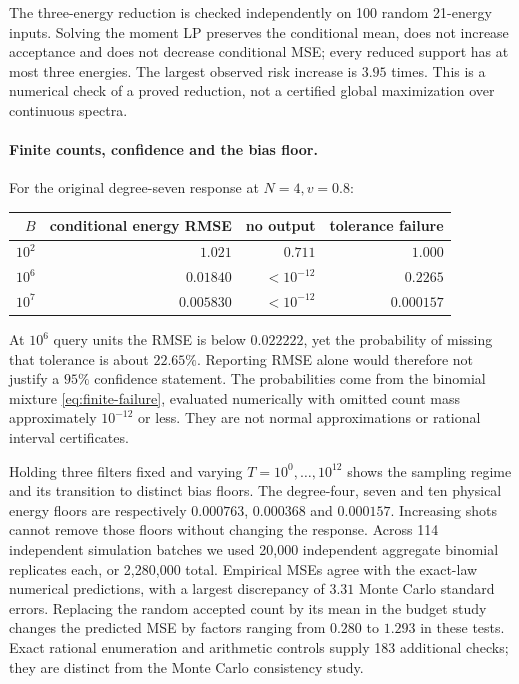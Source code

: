 The three-energy reduction is checked independently on 100 random
21-energy inputs. Solving the moment LP preserves the conditional mean,
does not increase acceptance and does not decrease conditional MSE;
every reduced support has at most three energies. The largest observed
risk increase is $3.95$ times. This is a numerical check of a proved
reduction, not a certified global maximization over continuous spectra.

\paragraph{Finite counts, confidence and the bias floor.}
For the original degree-seven response at $N=4,v=0.8$:
\begin{center}\small
\begin{tabular}{rrrr}
\toprule
$B$ & conditional energy RMSE & no output & tolerance failure\\
\midrule
$10^2$ & $1.021$ & $0.711$ & $1.000$\\
$10^6$ & $0.01840$ & $<10^{-12}$ & $0.2265$\\
$10^7$ & $0.005830$ & $<10^{-12}$ & $0.000157$\\
\bottomrule
\end{tabular}
\end{center}
At $10^6$ query units the RMSE is below $0.022222$, yet the probability
of missing that tolerance is about $22.65\%$. Reporting RMSE alone would
therefore not justify a $95\%$ confidence statement. The probabilities
come from the binomial mixture \eqref{eq:finite-failure}, evaluated
numerically with omitted count mass approximately $10^{-12}$ or less.
They are not normal approximations or rational interval certificates.

Holding three filters fixed and varying $T=10^0,\ldots,10^{12}$ shows
the sampling regime and its transition to distinct bias floors.
The degree-four, seven and ten physical energy floors are respectively
$0.000763$, $0.000368$ and $0.000157$. Increasing shots cannot remove
those floors without changing the response.
Across 114 independent simulation batches we used 20,000 independent aggregate
binomial replicates each, or 2,280,000 total. Empirical MSEs agree with
the exact-law numerical predictions, with a largest discrepancy of
$3.31$ Monte Carlo standard errors. Replacing the random accepted count
by its mean in the budget study changes the predicted MSE by factors
ranging from $0.280$ to $1.293$ in these tests.
Exact rational enumeration and arithmetic controls supply 183 additional
checks; they are distinct from the Monte Carlo consistency study.

